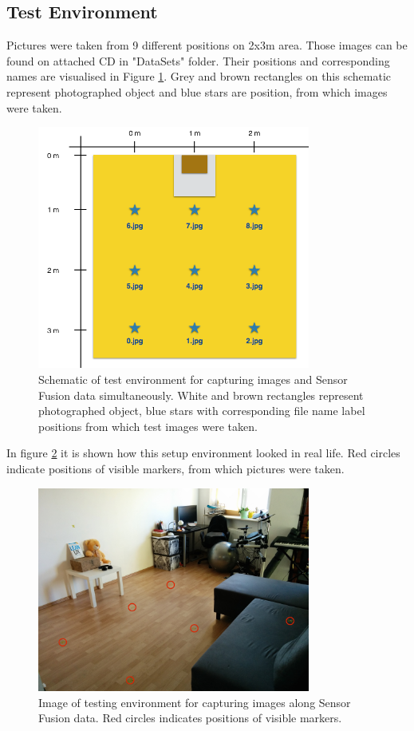 \subsection{Test Environment}
Pictures were taken from 9 different positions on 2x3m area. Those images can be found on attached CD in "DataSets" folder. Their positions and corresponding names are visualised in Figure \ref{fig:setup_schematic}. Grey and brown rectangles on this schematic represent photographed object and blue stars are position, from which images were taken. 
\begin{figure}[h!]
    \centering
    \includegraphics[width=0.8\textwidth]{setup_schematic}
    \caption[Schematic of test environment for capturing images along Sensor Fusion data]{Schematic of test environment for capturing images and Sensor Fusion data simultaneously. White and brown rectangles represent photographed object, blue stars with corresponding file name label positions from which test images were taken.}
    \label{fig:setup_schematic}
\end{figure}
In figure \ref{fig:setup_env_rot_test} it is shown how this setup environment looked in real life. Red circles indicate positions of visible markers, from which pictures were taken. 
\begin{figure}[h!]
    \centering
    \includegraphics[width=0.8\textwidth]{setup_env_rot_test}
    \caption[Image of testing environment for capturing images along Sensor Fusion data]{Image of testing environment for capturing images along Sensor Fusion data. Red circles indicates positions of visible markers.}
    \label{fig:setup_env_rot_test}
\end{figure}
